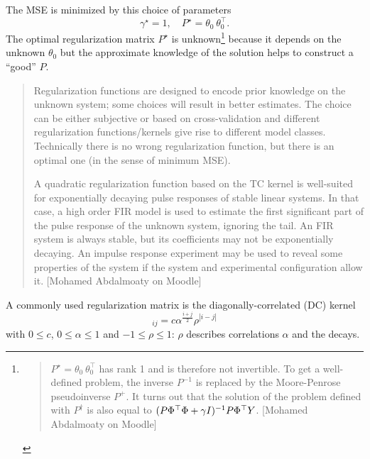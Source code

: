 The MSE is minimized by this choice of parameters
\begin{equation}
  \label{eq:regLS-optimal-parameters}
  \gamma^\star = 1,\hspace{1em} P^\star = \theta_0^{\phantom{\top}} \theta_0^\top.
\end{equation}
The optimal regularization matrix $P^\star$ is unknown\footnote{\begin{quotation}
  $P^\star = \theta_0^{\phantom{\top}} \theta_0^\top$ has rank 1 and is therefore not invertible. To get a well-defined problem, the inverse $P^{-1}$ is replaced by the Moore-Penrose pseudoinverse $P^+$. It turns out that the solution of the problem defined with $P^\dagger$ is also equal to $(P\Phi^\top \Phi+\gamma I)^{-1}P\Phi^\top Y$. [Mohamed Abdalmoaty on Moodle]
\end{quotation}} because it depends on the unknown $\theta_0$ but the approximate knowledge of the solution helps to construct a ``good'' $P$.

\begin{quotation}
  Regularization functions are designed to encode prior knowledge on the unknown system; some choices will result in better estimates. The choice can be either subjective or based on cross-validation and different regularization functions/kernels give rise to different model classes. Technically there is no wrong regularization function, but there is an optimal one (in the sense of minimum MSE).

  A quadratic regularization function based on the TC kernel is well-suited for exponentially decaying pulse responses of stable linear systems. In that case, a high order FIR model is used to estimate the first significant part of the pulse response of the unknown system, ignoring the tail. An FIR system is always stable, but its coefficients may not be exponentially decaying. An impulse response experiment may be used to reveal some properties of the system if the system and experimental configuration allow it. [Mohamed Abdalmoaty on Moodle]
  \end{quotation}

A commonly used regularization matrix is the diagonally-correlated (DC) kernel
\begin{equation*}
  [P]_{ij} = c\alpha^{\frac{i+j}{2}}\rho^{|i-j|}
\end{equation*}
with $0 \le c$, $0 \le \alpha \le 1$ and $-1 \le \rho \le 1$: $\rho$ describes correlations $\alpha$ and the decays.

